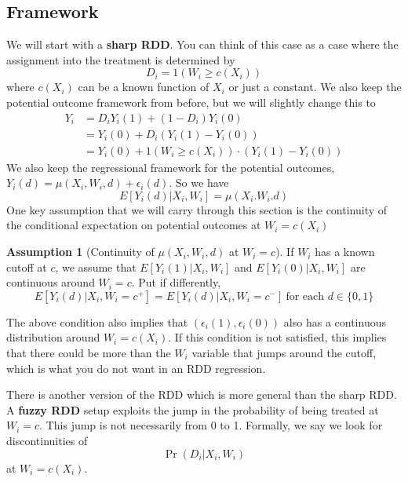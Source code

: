 \documentclass[12pt]{article}
\theoremstyle{definition}
\theoremstyle{property}
\theoremstyle{assumption}
\newtheorem{assumption}{Assumption}[section]
\theoremstyle{example}
\theoremstyle{comment}
\begin{document}
\subsection{Framework}
We will start with a \textbf{sharp RDD}. You can think of this case as a case where the assignment into the treatment is determined by
\[
D_i=1(W_i\geq c(X_i))
\]
where $c(X_i)$ can be a known function of $X_i$ or just a constant. We also keep the potential outcome framework from before, but we will slightly change this to
\begin{align*}
Y_i& = D_iY_i(1)+(1-D_i)Y_i(0)\\
&=Y_i(0)+D_i(Y_i(1)-Y_i(0))\\
&=Y_i(0)+1(W_i\geq c(X_i))\cdot(Y_i(1)-Y_i(0))
\end{align*}
We also keep the regressional framework for the potential outcomes, $Y_i(d)=\mu(X_i,W_i,d)+\epsilon_i(d)$. So we have
\[
E[Y_i(d)|X_i,W_i]=\mu(X_i.W_i.d)
\]
One key assumption that we will carry through this section is the continuity of the conditional expectation on potential outcomes at $W_i=c(X_i)$
\begin{mdframed}[backgroundcolor=blue!5] 
\begin{assumption}[Continuity of $\mu(X_i,W_i,d)$ at $W_i=c$] If $W_i$ has a known cutoff at $c$, we assume that $E[Y_i(1)|X_i, W_i]$ and $E[Y_i(0)|X_i, W_i]$ are continuous around $W_i=c$. Put if differently, 
\[
E[Y_i(d)|X_i, W_i=c^+]=E[Y_i(d)|X_i, W_i=c^-] \ \text{for each } d\in\{0,1\}
\]
\end{assumption}
\end{mdframed}
The above condition also implies that $(\epsilon_i(1), \epsilon_i(0))$ also has a continuous distribution around $W_i=c(X_i)$. If this condition is not satisfied, this implies that there could be more than the $W_i$ variable that jumps around the cutoff, which is what you do not want in an RDD regression.  \par
There is another version of the RDD which is more general than the sharp RDD. A \textbf{fuzzy RDD} setup exploits the jump in the probability of being treated at $W_i=c$. This jump is not necessarily from 0 to 1. Formally, we say we look for discontinuities of 
\[
\Pr(D_i|X_i,W_i)
\]
at $W_i=c(X_i)$. 
\end{document}
